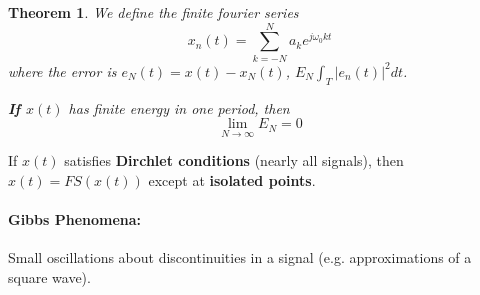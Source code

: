 \documentclass[a4paper,12pt]{report}
\newtheorem{theorem}{Theorem}
\begin{document}
\begin{theorem}
We define the finite fourier series 
\begin{equation}
x_n(t) = \sum_{k=-N}^{N} a_k e^{j\omega_0 kt}
\end{equation}
where the error is $e_N(t) = x(t) - x_N(t)$, $E_N \int_{T}^{} |e_n(t)|^2 dt$. 

\textbf{If $x(t)$} has finite energy in one period, then 
\begin{equation}
\lim_{N\to \infty} E_N = 0
\end{equation}

\end{theorem}

If $x(t)$ satisfies \textbf{Dirchlet conditions} (nearly all signals), then $x(t) = FS(x(t))$ except at \textbf{isolated points}.

\paragraph{Gibbs Phenomena: } Small oscillations about discontinuities in a signal (e.g. approximations of a square wave).
\end{document}
